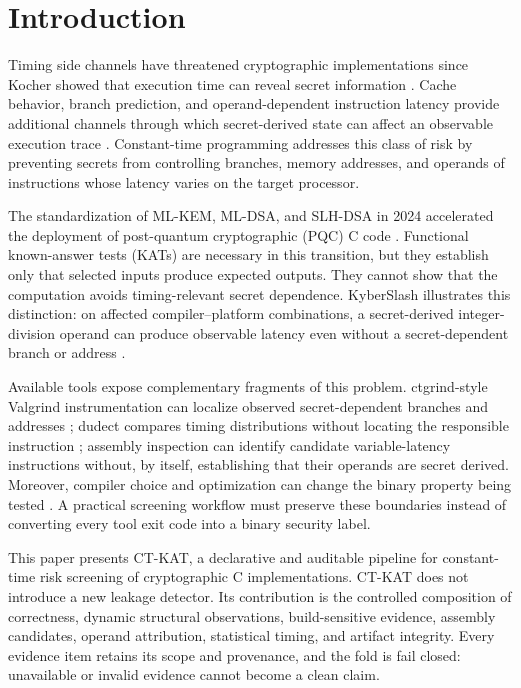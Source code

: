 \documentclass[cryptography,article,submit,moreauthors]{Definitions/mdpi}
\begin{document}
\section{Introduction}
\label{sec:introduction}

Timing side channels have threatened cryptographic implementations since
Kocher showed that execution time can reveal secret information
\citep{kocher96}. Cache behavior, branch prediction, and operand-dependent
instruction latency provide additional channels through which secret-derived
state can affect an observable execution trace \citep{bernstein2005cache}.
Constant-time programming addresses this class of risk by preventing secrets
from controlling branches, memory addresses, and operands of instructions
whose latency varies on the target processor.

The standardization of ML-KEM, ML-DSA, and SLH-DSA in 2024 accelerated the
deployment of post-quantum cryptographic (PQC) C code
\citep{nist2024fips203,nist2024fips204,nist2024fips205}. Functional
known-answer tests (KATs) are necessary in this transition, but they establish
only that selected inputs produce expected outputs. They cannot show that the
computation avoids timing-relevant secret dependence. KyberSlash illustrates
this distinction: on affected compiler--platform combinations, a
secret-derived integer-division operand can produce observable latency even
without a secret-dependent branch or address \citep{bernstein2024kyberslash}.

Available tools expose complementary fragments of this problem. ctgrind-style
Valgrind instrumentation can localize observed secret-dependent branches and
addresses \citep{langley2010ctgrind,nethercote2007valgrind}; dudect compares
timing distributions without locating the responsible instruction
\citep{reparaz2017dude}; assembly inspection can identify candidate
variable-latency instructions without, by itself, establishing that their
operands are secret derived. Moreover, compiler choice and optimization can
change the binary property being tested \citep{simon2018you}. A practical
screening workflow must preserve these boundaries instead of converting every
tool exit code into a binary security label.

This paper presents CT-KAT, a declarative and auditable pipeline for
constant-time risk screening of cryptographic C implementations. CT-KAT does
not introduce a new leakage detector. Its contribution is the controlled
composition of correctness, dynamic structural observations, build-sensitive
evidence, assembly candidates, operand attribution, statistical timing, and
artifact integrity. Every evidence item retains its scope and provenance, and
the fold is fail closed: unavailable or invalid evidence cannot become a clean
claim.
\end{document}
